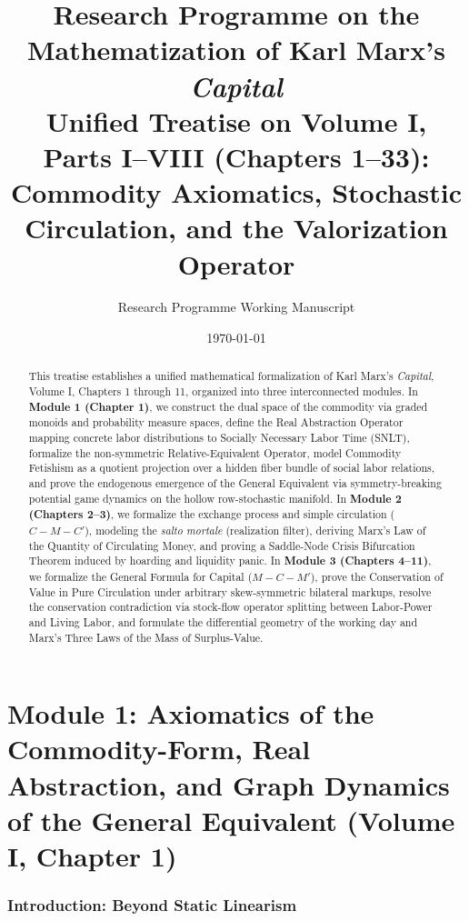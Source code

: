 \documentclass[11pt,a4paper]{article}
\title{\textbf{Research Programme on the Mathematization of Karl Marx's \textit{Capital}}\\[0.5em]
\large Unified Treatise on Volume I, Parts I--VIII (Chapters 1--33):\\
Commodity Axiomatics, Stochastic Circulation, and the Valorization Operator}
\author{Research Programme Working Manuscript}
\date{\today}
\begin{document}
\maketitle

\begin{abstract}
This treatise establishes a unified mathematical formalization of Karl Marx's \textit{Capital}, Volume I, Chapters 1 through 11, organized into three interconnected modules. In \textbf{Module 1 (Chapter 1)}, we construct the dual space of the commodity via graded monoids and probability measure spaces, define the Real Abstraction Operator mapping concrete labor distributions to Socially Necessary Labor Time (SNLT), formalize the non-symmetric Relative-Equivalent Operator, model Commodity Fetishism as a quotient projection over a hidden fiber bundle of social labor relations, and prove the endogenous emergence of the General Equivalent via symmetry-breaking potential game dynamics on the hollow row-stochastic manifold. In \textbf{Module 2 (Chapters 2--3)}, we formalize the exchange process and simple circulation ($C - M - C'$), modeling the \textit{salto mortale} (realization filter), deriving Marx's Law of the Quantity of Circulating Money, and proving a Saddle-Node Crisis Bifurcation Theorem induced by hoarding and liquidity panic. In \textbf{Module 3 (Chapters 4--11)}, we formalize the General Formula for Capital ($M - C - M'$), prove the Conservation of Value in Pure Circulation under arbitrary skew-symmetric bilateral markups, resolve the conservation contradiction via stock-flow operator splitting between Labor-Power and Living Labor, and formulate the differential geometry of the working day and Marx's Three Laws of the Mass of Surplus-Value.
\end{abstract}

\tableofcontents
\newpage

\part{Module 1: Axiomatics of the Commodity-Form, Real Abstraction, and Graph Dynamics of the General Equivalent (Volume I, Chapter 1)}

\section{Introduction: Beyond Static Linearism}
\end{document}
